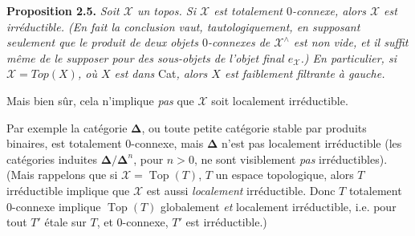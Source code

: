 \documentclass[11pt]{article}
\newcommand{\msp}[1]{\marginpar{\footnotesize [#1]}}
\newcommand{\sX}{\mathcal{X}} %
\begin{document}
\noindent\textbf{Proposition 2.5.} \textit{Soit $\sX$ un topos. Si $\sX$ est totalement $0$-connexe, alors $\sX$ est irréductible. (En fait la conclusion vaut, tautologiquement, en supposant seulement que le produit de deux objets $0$-connexes de $\sX^{\wedge}$ est non vide, et il suffit même de le supposer pour des sous-objets de l'objet final $e_{\sX}$.) En particulier, si $\sX = \mathit{Top}(X)$, où $X$ est dans} Cat\textit{, alors $X$ est faiblement filtrante à gauche.}

Mais bien sûr, cela n'implique \textit{pas} que $\sX$ soit localement irréductible.

\msp{page 19}

\noindent Par exemple la catégorie $\boldsymbol{\Delta}$, ou toute petite catégorie stable par produits binaires, est totalement 0-connexe, mais $\boldsymbol{\Delta}$ n'est pas localement irréductible (les catégories induites $\boldsymbol{\Delta}/\boldsymbol{\Delta}^n$, pour $n > 0$, ne sont visiblement \textit{pas} irréductibles). (Mais rappelons que si $\sX = \operatorname{Top}(T)$, $T$ un espace topologique, alors $T$ irréductible implique que $\sX$ est aussi \textit{localement} irréductible. Donc $T$ totalement 0-connexe implique $\operatorname{Top}(T)$ globalement \textit{et} localement irréductible, i.e. pour tout $T'$ étale sur $T$, et 0-connexe, $T'$ est irréductible.)
\end{document}
